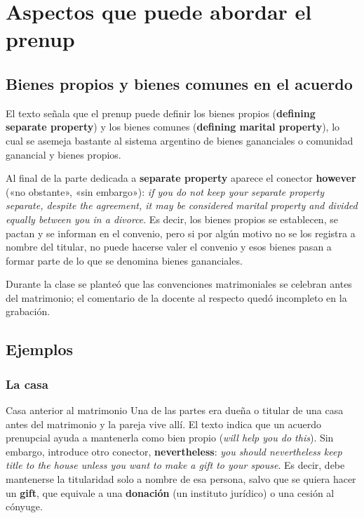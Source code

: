 \documentclass[12pt,oneside]{book}
\begin{document}
\chapter[Aspectos que puede abordar]{Aspectos que puede abordar el prenup}

\section{Bienes propios y bienes comunes en el acuerdo}

El texto señala que el prenup puede definir los bienes propios (\textbf{defining separate property}) y los bienes comunes (\textbf{defining marital property}), lo cual se asemeja bastante al sistema argentino de bienes gananciales o comunidad ganancial y bienes propios.

Al final de la parte dedicada a \textbf{separate property} aparece el conector \textbf{however} («no obstante», «sin embargo»): \textit{if you do not keep your separate property separate, despite the agreement, it may be considered marital property and divided equally between you in a divorce}. Es decir, los bienes propios se establecen, se pactan y se informan en el convenio, pero si por algún motivo no se los registra a nombre del titular, no puede hacerse valer el convenio y esos bienes pasan a formar parte de lo que se denomina bienes gananciales.

\begin{note}
Durante la clase se planteó que las convenciones matrimoniales se celebran antes del matrimonio; el comentario de la docente al respecto quedó incompleto en la grabación.
\end{note}

\section{Ejemplos}

\subsection{La casa}

\begin{example}{Casa anterior al matrimonio}
Una de las partes era dueña o titular de una casa antes del matrimonio y la pareja vive allí. El texto indica que un acuerdo prenupcial ayuda a mantenerla como bien propio (\textit{will help you do this}). Sin embargo, introduce otro conector, \textbf{nevertheless}: \textit{you should nevertheless keep title to the house unless you want to make a gift to your spouse}. Es decir, debe mantenerse la titularidad solo a nombre de esa persona, salvo que se quiera hacer un \textbf{gift}, que equivale a una \textbf{donación} (un instituto jurídico) o una cesión al cónyuge.
\end{example}
\end{document}
